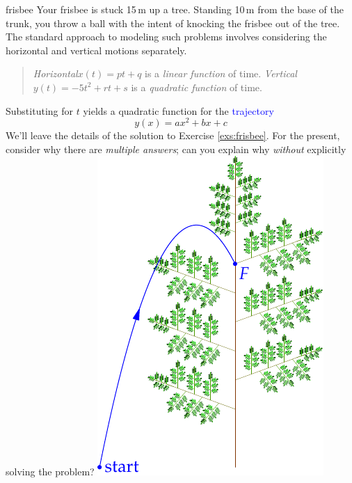 \begin{example}[lower separated=false, sidebyside, sidebyside align=top seam, sidebyside gap=0pt, righthand width=0.32\linewidth]{}{frisbee}
	Your frisbee is stuck 15\,m up a tree. Standing 10\,m from the base of the trunk, you throw a ball with the intent of knocking the frisbee out of the tree.\smallbreak
	The standard approach to modeling such problems involves considering the horizontal and vertical motions separately.
	\begin{quote}
		\emph{Horizontal}\lstsp $x(t)=pt+q$ is a \emph{linear function} of time.\smallbreak
		\emph{Vertical}\lstsp $y(t)=-5t^2+rt+s$ is a \emph{quadratic function} of time.
	\end{quote}
	Substituting for $t$ yields a quadratic function for the \textcolor{blue}{trajectory}
	\[
		y(x)=ax^2+bx+c
	\]
	We'll leave the details of the solution to Exercise \ref{exs:frisbee}. For the present, consider why there are \emph{multiple answers}; can you explain why \emph{without} explicitly solving the problem?
	\tcblower
	\flushright\includegraphics[scale=0.88]{tree1}
\end{example}


